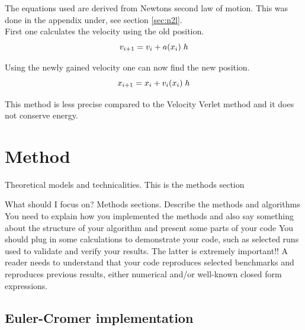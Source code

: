 \documentclass{article}
\begin{document}
    The equations used are derived from Newtons second law of motion. This was done in the appendix under, see section \ref{sec:n2l}. \\

    First one calculates the velocity using the old position. \\

    \begin{equation}    \label{eq:Evelocity}
        v_{i+1} = v_i +  a(x_i) \; h \\
    \end{equation}

    Using the newly gained velocity one can now find the new position. \\

    \begin{equation}    \label{eq:Eposition}
        x_{i+1} = x_i +  v_{i}(x_i) \; h \\
    \end{equation}

    This method is less precise compared to the Velocity Verlet method and it does not conserve energy. \\


\vspace{1cm}

\section{Method} \label{sec:Method}

Theoretical models and technicalities. This is the methods section


What should I focus on? Methods sections.
Describe the methods and algorithms
You need to explain how you implemented the methods and also say something about the structure of your algorithm and present some parts of your code
You should plug in some calculations to demonstrate your code, such as selected runs used to validate and verify your results. The latter is extremely important!! A reader needs to understand that your code reproduces selected benchmarks and reproduces previous results, either numerical and/or well-known closed form expressions.

\subsection{Euler-Cromer implementation}    \label{sec:eulercromer}
\end{document}
